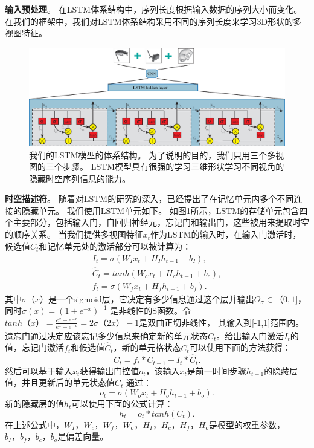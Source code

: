 \textbf {输入预处理}。 在LSTM体系结构中，序列长度根据输入数据的序列大小而变化。 在我们的框架中，我们对LSTM体系结构采用不同的序列长度来学习3D形状的多视图特征。

\begin{figure} [htbp]
\begin{center}
\includegraphics[width=0.98\linewidth]{figures/CNN_LSTM_lstm.eps}
\end{center} 
\vspace{-4mm}
\caption{我们的LSTM模型的体系结构。 为了说明的目的，我们只用三个多视图的三个步骤。 LSTM模型具有很强的学习三维形状学习不同视角的隐藏时空序列信息的能力。 }
\label{fig_lstm}
\end{figure}

\textbf {时空描述符}。 随着对LSTM的研究的深入，已经提出了在记忆单元内多个不同连接的隐藏单元。 我们使用LSTM单元如下。 如图\ref{fig_lstm}所示，LSTM的存储单元包含四个主要部分，包括输入门，自回归神经元，忘记门和输出门，这些被用来提取时空的顺序关系。 当我们提供多视图特征$ x_t $作为LSTM的输入时，在输入门激活时，候选值$ \hat {C}_t $和记忆单元处的激活部分可以被计算为：
\begin{eqnarray}
 I_t =  \sigma \left( W_Ix_t + H_Ih_{t-1} + b_I\right), \\
 \hat{C}_t =  tanh(W_cx_t + H_ch_{t-1} + b_c), \\
 f_t = \sigma(W_fx_t + H_fh_{t-1} + b_f).
\end{eqnarray}
%
其中$ \sigma（x）$是一个sigmoid层，它决定有多少信息通过这个层并输出$ O_\sigma \in（0,1] $，同时$ \sigma(x) = (1 + e^{-x})^{-1}$ 是非线性的S函数。令$ tanh（x）= \frac {e ^ x-e ^ { - x}} {e ^ x + e ^ { - x}} = 2 \sigma（2x）-1 $是双曲正切非线性， 其输入到[-1,1]范围内。遗忘门通过决定应该忘记多少信息来确定新的单元状态$ C_t $。给出输入门激活$ I_t $的值，忘记门激活$ f_t $和候选值$ \hat {C} _t $，新的单元格状态$ C_t $可以使用下面的方法获得：
%
\begin{equation}
  C_t = f_t * C_{t-1} + I_t * \hat{C}_t.
\end{equation}
%
然后可以基于输入$ x_t $获得输出门控值$ o_t $，该输入$ x_t $是前一时间步骤$ h_ {t-1} $的隐藏层值，并且更新后的单元状态值$ C_t $ 通过：
%
\begin{equation}
  o_t = \sigma(W_ox_t + H_oh_{t-1} + b_o).
\end{equation}
%
新的隐藏层的值$ h_t $可以使用下面的公式计算：
\begin{equation}
  h_t = o_t*tanh(C_t).
\end{equation}
在上述公式中，$ W_I，W_c，W_f，W_o，H_I，H_c，H_f，H_o $是模型的权重参数，$ b_I，b_f，b_c，b_o $是偏差向量。

